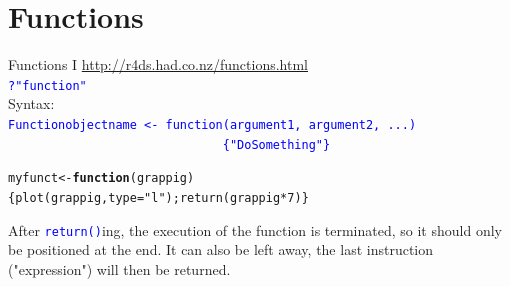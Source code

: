 \documentclass[xcolor=table,      handout ,    xcolor=dvipsnames]{beamer}\usepackage[]{graphicx}\usepackage[]{color}
\makeatletter
\newcommand{\hlnum}[1]{\textcolor[rgb]{0,0,0}{#1}}
\newcommand{\hlstr}[1]{\textcolor[rgb]{0.545,0.137,0.137}{#1}}
\newcommand{\hlopt}[1]{\textcolor[rgb]{0,0,0}{#1}}
\newcommand{\hlstd}[1]{\textcolor[rgb]{0,0,0}{#1}}
\newcommand{\hlkwa}[1]{\textcolor[rgb]{1,0,0}{\textbf{#1}}}
\newcommand{\hlkwb}[1]{\textcolor[rgb]{0,0,0}{#1}}
\newcommand{\hlkwc}[1]{\textcolor[rgb]{1,0,1}{#1}}
\newcommand{\hlkwd}[1]{\textcolor[rgb]{0,0,1}{#1}}
\newenvironment{kframe}{%
 \def\at@end@of@kframe{}%
 \ifinner\ifhmode%
  \def\at@end@of@kframe{\end{minipage}}%
  \begin{minipage}{\columnwidth}%
 \fi\fi%
 \def\FrameCommand##1{\hskip\@totalleftmargin \hskip-\fboxsep
 \colorbox{shadecolor}{##1}\hskip-\fboxsep
     \hskip-\linewidth \hskip-\@totalleftmargin \hskip\columnwidth}%
 \MakeFramed {\advance\hsize-\width
   \@totalleftmargin\z@ \linewidth\hsize
   \@setminipage}}%
 {\par\unskip\endMakeFramed%
 \at@end@of@kframe}
\newenvironment{knitrout}{}{} %
\newcommand{\rcode}[1]{\texttt{\textcolor{Blue}{#1}}}
\makeatother
\begin{document}
\fi %
\section{Functions}

\begin{frame}[fragile]{Functions I}
\label{functions1}
\href{http://r4ds.had.co.nz/functions.html}{http://r4ds.had.co.nz/functions.html}\\
\pause
\rcode{?"function"}\\
\pause  Syntax:\\
\rcode{Functionobjectname <- \alert{function}(argument1, argument2, ...) \\
~~~~~~~~~~~~~~~~~~~~~~~~~~~~~~\{"DoSomething"\}}\\
\pause
\begin{knitrout}
\color{fgcolor}\begin{kframe}
\begin{alltt}
\hlstd{myfunct} \hlkwb{<-} \hlkwa{function}\hlstd{(}\hlkwc{grappig}\hlstd{)}
       \hlstd{\{}\hlkwd{plot}\hlstd{(grappig,} \hlkwc{type}\hlstd{=}\hlstr{"l"}\hlstd{);} \hlkwd{return}\hlstd{(grappig}\hlopt{*}\hlnum{7}\hlstd{)  \}}
\end{alltt}
\end{kframe}
\end{knitrout}
\pause
After \rcode{return()}ing, the execution of the function is terminated, so it should only be positioned at the end. It can also be left away, the last instruction ("expression") will then be returned.
\end{frame}

\end{document}
